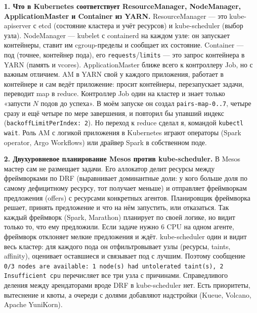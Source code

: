 \documentclass[11pt,a4paper]{article}
\DeclareRobustCommand{\code}[1]{\begingroup\renewcommand{\_}{\textunderscore\allowbreak}\renewcommand{\slash}{/\allowbreak}\texttt{#1}\endgroup}
\begin{document}
\textbf{1. Что в Kubernetes соответствует ResourceManager, NodeManager, ApplicationMaster и Container из YARN.} ResourceManager --- это kube-apiserver с etcd (состояние кластера и учёт ресурсов) и kube-scheduler (выбор узла). NodeManager --- kubelet с containerd на каждом узле: он запускает контейнеры, ставит им cgroup-пределы и сообщает их состояние. Container --- под (точнее, контейнер пода), его \code{requests}/\code{limits} --- это запрос контейнера в YARN (память и vcores). ApplicationMaster ближе всего к контроллеру Job, но с важным отличием. AM в YARN свой у каждого приложения, работает в контейнере и сам ведёт приложение: просит контейнеры, перезапускает задачи, переводит map в reduce. Контроллер Job один на кластер и знает только «запусти $N$ подов до успеха». В моём запуске он создал \code{pairs-map-0..7}, четыре сразу и ещё четыре по мере завершения, и повторил бы упавший индекс (\code{backoffLimitPerIndex: 2}). Но переход к reduce сделал я, командой \code{kubectl wait}. Роль AM с логикой приложения в Kubernetes играют операторы (Spark operator, Argo Workflows) или драйвер Spark в собственном поде.

\textbf{2. Двухуровневое планирование Mesos против kube-scheduler.} В Mesos мастер сам не размещает задачи. Его аллокатор делит ресурсы между фреймворками по DRF (выравнивает доминантные доли: у кого больше доля по самому дефицитному ресурсу, тот получает меньше) и отправляет фреймворкам предложения (offers) с ресурсами конкретных агентов. Планировщик фреймворка решает, принять предложение и что на нём запустить, или отказаться. Так каждый фреймворк (Spark, Marathon) планирует по своей логике, но видит только то, что ему предложили. Если задаче нужно 6 CPU на одном агенте, фреймворк отклоняет мелкие предложения и ждёт. kube-scheduler один и видит весь кластер: для каждого пода он отфильтровывает узлы (ресурсы, taints, affinity), оценивает оставшиеся и связывает под с лучшим. Поэтому сообщение \code{0/3 nodes are available: 1 node(s) had untolerated taint(s), 2 Insufficient cpu} перечисляет все три узла с причинами. Справедливого деления между арендаторами вроде DRF в kube-scheduler нет. Есть приоритеты, вытеснение и квоты, а очереди с долями добавляют надстройки (Kueue, Volcano, Apache YuniKorn).
\end{document}
